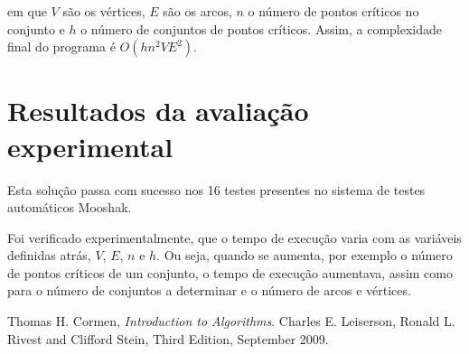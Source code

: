 \documentclass[12pt]{article}
\begin{document}
em que $V$ são os vértices, $E$ são os arcos, $n$ o número de pontos críticos no conjunto e $h$ o número de conjuntos de pontos críticos. Assim, a complexidade final do programa é $O(h n^2 V E^2)$.



\section*{Resultados da avaliação experimental}

Esta solução passa com sucesso nos 16 testes presentes no sistema de testes automáticos Mooshak.

Foi verificado experimentalmente, que o tempo de execução varia com as variáveis definidas atrás, $V$, $E$, $n$ e $h$. Ou seja, quando se aumenta, por exemplo o número de pontos críticos de um conjunto, o tempo de execução aumentava, assim como para o número de conjuntos a determinar e o número de arcos e vértices. 



\begin{thebibliography}{9}

  Thomas H. Cormen,
  \emph{Introduction to Algorithms}.
  Charles E. Leiserson, Ronald L. Rivest and Clifford Stein,
  Third Edition,
  September 2009.
  


\end{thebibliography}
\end{document}
